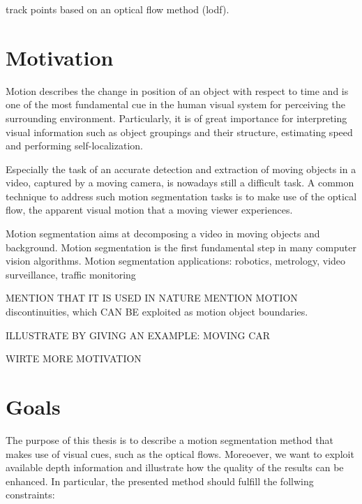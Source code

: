 track points based on an optical flow method (lodf). 




\section{Motivation}

Motion describes the change in position of an object with respect to time and is one of the most fundamental cue in the human visual system for perceiving the surrounding environment. Particularly, it is of great importance for interpreting visual information such as object groupings and their structure, estimating speed and performing self-localization.

Especially the task of an accurate detection and extraction of moving objects in a video, captured by a moving camera, is nowadays still a difficult task. A common technique to address such motion segmentation tasks is to make use of the optical flow, the apparent visual motion that a moving viewer experiences. 



Motion segmentation aims at decomposing a video in moving objects and background.
Motion segmentation is the first fundamental step in many computer vision algorithms.
Motion segmentation applications: robotics, metrology, video surveillance, traffic monitoring


MENTION THAT IT IS USED IN NATURE
MENTION MOTION discontinuities, which CAN BE exploited as motion object boundaries.


ILLUSTRATE BY GIVING AN EXAMPLE: MOVING CAR

WIRTE MORE MOTIVATION


\section{Goals}

The purpose of this thesis is to describe a motion segmentation method that makes use of visual cues, such as the optical flows. Moreoever, we want to exploit available depth information and illustrate how the quality of the results can be enhanced. In particular, the presented method should fulfill the follwing constraints:

